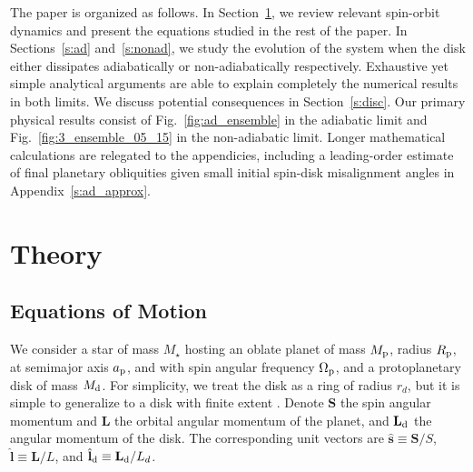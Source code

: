 \documentclass[
        fleqn,
        usenatbib,
        referee,
    ]{mnras}
\newcommand*{\bm}[1]{\boldsymbol{\mathbf{#1}}}
\newcommand*{\uv}[1]{\hat{\bm{#1}}}
\begin{document}
The paper is organized as follows. In Section~\ref{s:eq}, we review relevant
spin-orbit dynamics and present the equations studied in the rest of the paper.
In Sections~\ref{s:ad} and~\ref{s:nonad}, we study the evolution of the system
when the disk either dissipates adiabatically or non-adiabatically respectively.
Exhaustive yet simple analytical arguments are able to explain completely the
numerical results in both limits. We discuss potential consequences in
Section~\ref{s:disc}. Our primary physical results consist of
Fig.~\ref{fig:ad_ensemble} in the adiabatic limit and
Fig.~\ref{fig:3_ensemble_05_15} in the non-adiabatic limit. Longer mathematical
calculations are relegated to the appendicies, including a leading-order
estimate of final planetary obliquities given small initial spin-disk
misalignment angles in Appendix~\ref{s:ad_approx}.

\section{Theory}\label{s:eq}

\subsection{Equations of Motion}

We consider a star of mass $M_\star$ hosting an oblate planet of mass $M_{\rm
p}$, radius $R_{\rm p}$, at semimajor axis $a_{\rm p}$, and with spin angular
frequency $\Omega_{\rm p}$, and a protoplanetary disk of mass $M_{\rm d}$. For
simplicity, we treat the disk as a ring of radius $r_d$, but it is simple to
generalize to a disk with finite extent \citep[see][]{millholland_disk}.
Denote $\bm{S}$ the spin angular momentum and $\bm{L}$ the orbital angular
momentum of the planet, and $\bm{L}_{\rm d}$ the angular momentum of the disk.
The corresponding unit vectors are $\uv{s} \equiv \bm{S} / S$,
$\uv{l} \equiv \bm{L} / L$, and $\uv{l}_{\rm d} \equiv \bm{L}_{\rm
d} / L_d$.
\end{document}
